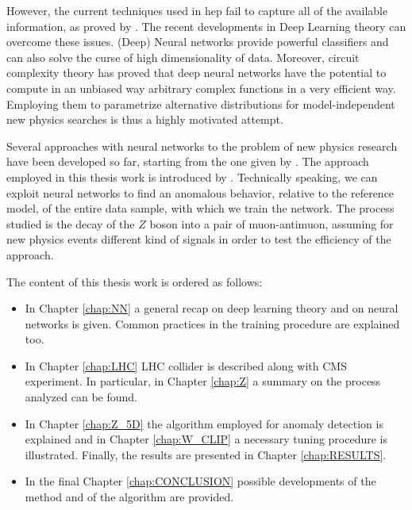 However, the current techniques used in hep fail to capture all of the available information, as proved by \cite{baldi}. The recent developments in Deep Learning theory can overcome these issues. (Deep) Neural networks provide powerful classifiers and can also solve the curse of high dimensionality of data. Moreover, circuit complexity theory has proved that deep neural networks have the potential to compute in an unbiased way arbitrary complex functions in a very efficient way. Employing them to parametrize alternative distributions for model-independent new physics searches is thus a highly motivated attempt.

Several approaches with neural networks to the problem of new physics research have been developed so far, starting from the one given by \cite{baldi}. The approach employed in this thesis work is introduced by \cite{wulzer}. Technically speaking, we can exploit neural networks to find an anomalous behavior, relative to the reference model, of the entire data sample, with which we train the network. The process studied is the decay of the $Z$ boson into a pair of muon-antimuon, assuming for new physics events different kind of signals in order to test the efficiency of the approach.

\vspace{5mm}
\noindent
The content of this thesis work is ordered as follows:
\begin{itemize}
	\item In Chapter \ref{chap:NN} a general recap on deep learning theory and on neural networks is given. Common practices in the training procedure are explained too.
	\item In Chapter \ref{chap:LHC} LHC collider is described along with CMS experiment. In particular, in Chapter \ref{chap:Z} a summary on the process analyzed can be found.
	\item In Chapter \ref{chap:Z_5D} the algorithm employed for anomaly detection is explained and in Chapter \ref{chap:W_CLIP} a necessary tuning procedure is illustrated. Finally, the results are presented in Chapter \ref{chap:RESULTS}.
	\item In the final Chapter \ref{chap:CONCLUSION} possible developments of the method and of the algorithm are provided.
\end{itemize}